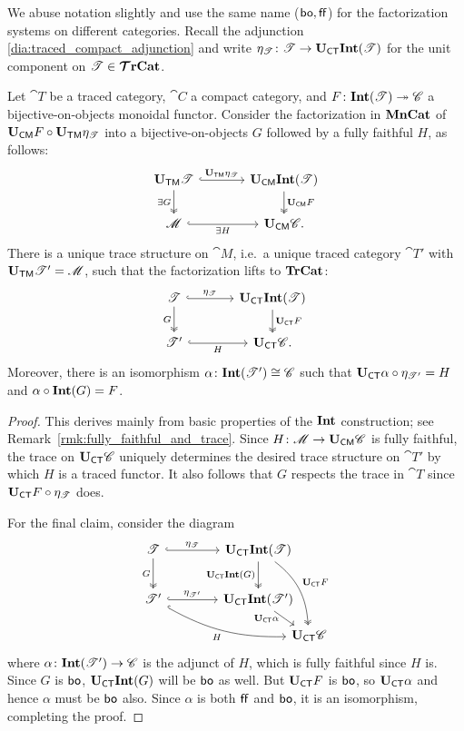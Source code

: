 \documentclass[11pt,oneside,article]{memoir}
\begin{document}
We abuse notation slightly and use the same name ($\mathsf{bo},\mathsf{ff}$) for the factorization systems on different categories. Recall
the adjunction \eqref{dia:traced_compact_adjunction} and write
$\eta_{\mathscr{T}}\colon\mathscr{T}\to\mathbf{U}_{\mathsf{CT}}\mathbf{Int}(\mathscr{T})$ for the unit component on $\mathscr{T}\in\bm{\mathcal{T}}\mathbf{rCat}$.

\begin{lemma}
    \label{lem:Tr_bo_Int}
  Let $\cat{T}$ be a traced category, $\cat{C}$ a compact category, and
  $F\colon\mathbf{Int}(\mathscr{T})\twoheadrightarrow \mathscr{C}$ a bijective-on-objects monoidal functor. Consider
  the factorization in $\mathbf{MnCat}$ of $\mathbf{U}_{\mathsf{CM}} F\circ\mathbf{U}_{\mathsf{TM}}\eta_{\mathscr{T}}$ into a bijective-on-objects $G$
  followed by a fully faithful $H$, as follows:
  \[ \begin{tikzcd}[column sep=large]
    \UTM \cat{T} \ar[r,hook,"\UTM\eta_{\cat{T}}"] \ar[d,two heads,"\exists G"']
      & \UCM\Int(\cat{T}) \ar[d,two heads,"\UCM F"] \\
    \cat{M} \ar[r,hook,"\exists H"'] & \UCM \cat{C}.
  \end{tikzcd} \]
  There is a unique trace structure on $\cat{M}$, i.e.\ a unique traced category $\cat{T}'$ with
  $\mathbf{U}_{\mathsf{TM}} \mathscr{T}'=\mathscr{M}$, such that the factorization lifts to $\mathbf{TrCat}$:
  \[ \begin{tikzcd}[column sep=large]
    \cat{T} \ar[r,hook,"\eta_{\cat{T}}"] \ar[d,two heads,"G"']
      & \UCT\Int(\cat{T}) \ar[d,two heads,"\UCT F"] \\
    \cat{T}' \ar[r,hook,"H"'] & \UCT \cat{C}.
  \end{tikzcd} \]
  Moreover, there is an isomorphism $\alpha\colon\mathbf{Int}(\mathscr{T}')\cong \mathscr{C}$ such that
  $\mathbf{U}_{\mathsf{CT}}\alpha\circ \eta_{\mathscr{T}'}=H$ and $\alpha\circ\mathbf{Int}(G)=F$.
\end{lemma}
\begin{proof}
  This derives mainly from basic properties of the $\mathbf{Int}$ construction; see
  Remark~\ref{rmk:fully_faithful_and_trace}. Since $H\colon\mathscr{M}\to\mathbf{U}_{\mathsf{CM}}\mathscr{C}$ is fully faithful,
  the trace on $\mathbf{U}_{\mathsf{CT}}\mathscr{C}$ uniquely determines the desired trace structure on $\cat{T}'$ by which
  $H$ is a traced functor. It also follows that $G$ respects the trace in $\cat{T}$ since $\mathbf{U}_{\mathsf{CT}}
  F\circ\eta_{\mathscr{T}}$ does.

  For the final claim, consider the diagram
  \[ \begin{tikzcd}[column sep=4em, row sep=5ex]
    \cat{T} \ar[r,hook,"\eta_{\cat{T}}"] \ar[d,two heads,"G"']
      & \UCT\Int(\cat{T}) \ar[d,two heads,"\UCT\Int(G)"']
        \ar[ddr,two heads,bend left=25,"\UCT F"] &[between origins] \\
    \cat{T}' \ar[r,hook,"\eta_{\cat{T}'}"] \ar[drr,hook,bend right=15,"H"']
      & \UCT\Int(\cat{T}') \ar[dr,"\UCT\alpha"' {inner sep=0pt,pos=.25}] & \\[-10]
      &&\UCT \cat{C}
  \end{tikzcd} \]
  where $\alpha\colon\mathbf{Int}(\mathscr{T}')\to \mathscr{C}$ is the adjunct of $H$, which is fully faithful since
  $H$ is. Since $G$ is $\mathsf{bo}$, $\mathbf{U}_{\mathsf{CT}}\mathbf{Int}(G)$ will be $\mathsf{bo}$ as well. But $\mathbf{U}_{\mathsf{CT}} F$ is $\mathsf{bo}$, so $\mathbf{U}_{\mathsf{CT}}
  \alpha$ and hence $\alpha$ must be $\mathsf{bo}$ also. Since $\alpha$ is both $\mathsf{ff}$ and $\mathsf{bo}$, it is an
  isomorphism, completing the proof.
\end{proof}
\end{document}
